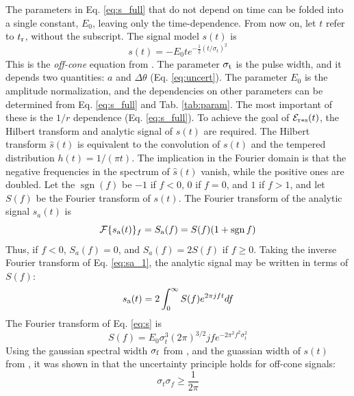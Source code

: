 \documentclass[amsmath,amssymb,aps,prd,10pt,twocolumn,showkeys]{revtex4}
\DeclareMathOperator{\sgn}{sgn}
\begin{document}
The parameters in Eq. \ref{eq:s_full} that do not depend on time can be folded into a single constant, $E_0$, leaving only the time-dependence.  From now on, let $t$ refer to $t_{\rm r}$, without the subscript.  The signal model $s(t)$ is
\begin{equation}
s(t) = -E_0 t e^{-\frac{1}{2}\left(t/\sigma_t\right)^2} \label{eq:s}
\end{equation}
This is the \textit{off-cone} equation from \cite{PhysRevD.105.123019}.  The parameter $\sigma_{\rm t}$ is the pulse width, and it depends two quantities: $a$ and $\Delta\theta$ (Eq. \ref{eq:uncert}).  The parameter $E_0$ is the amplitude normalization, and the dependencies on other parameters can be determined from Eq. \ref{eq:s_full} and Tab. \ref{tab:param}.  The most important of these is the $1/r$ dependence (Eq. \ref{eq:s_full}).  To achieve the goal of $\mathcal{E}_{\rm r * s}(t)$, the Hilbert transform and analytic signal of $s(t)$ are required.  The Hilbert transform $\widehat{s}(t)$ is equivalent to the convolution of $s(t)$ and the tempered distribution $h(t) = 1/(\pi t)$.  The implication in the Fourier domain is that the negative frequencies in the spectrum of $\hat{s}(t)$ vanish, while the positive ones are doubled.  Let the $\sgn(f)$ be $-1$ if $f<0$, $0$ if $f=0$, and $1$ if $f>1$, and let $S(f)$ be the Fourier transform of $s(t)$.  The Fourier transform of the analytic signal $s_a(t)$ is
\begin{equation}
\mathcal{F}\lbrace s_{\rm a}(t) \rbrace_{f} = S_{\rm a}(f) = S(f)(1+\sgn{f}) \label{eq:sa_1}
\end{equation}
Thus, if $f<0$, $S_a(f) = 0$, and $S_a(f) = 2S(f)$ if $f\geq 0$.  Taking the inverse Fourier transform of Eq. \ref{eq:sa_1}, the analytic signal may be written in terms of $S(f)$:
\begin{equation}
s_{\rm a}(t) = 2\int_{0}^{\infty} S(f) e^{2\pi j f t} df \label{eq:sa_2}
\end{equation}
 The Fourier transform of Eq. \ref{eq:s} is
\begin{equation}
S(f) = E_0 \sigma_t^3 (2\pi)^{3/2} j f e^{-2\pi^2 f^2 \sigma_t^2}
\end{equation}
Using the gaussian spectral width $\sigma_{\rm f}$ from \cite{10.1016/j.astropartphys.2017.03.008}, and the guassian width of $s(t)$ from \cite{PhysRevD.105.123019}, it was shown in \cite{PhysRevD.105.123019} that the uncertainty principle holds for off-cone signals:
\begin{equation}
\sigma_t \sigma_f \geq \frac{1}{2\pi}
\end{equation}
\end{document}
